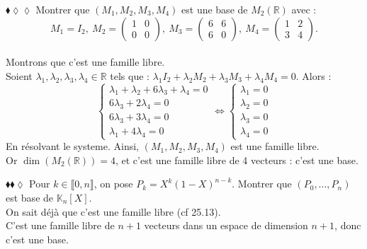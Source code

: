 \documentclass[11pt]{article}
\newcommand*{\R}{\mathbb{R}}
\newcommand*{\K}{\mathbb{K}}
\begin{document}
\begin{exercise}{$\blacklozenge\lozenge\lozenge$}{}
    Montrer que $(M_1, M_2, M_3, M_4)$ est une base de $M_2(\R)$ avec :
    \begin{equation*}
        M_1 = I_2, ~ M_2 = \begin{pmatrix} 1 & 0 \\ 0 & 0 \end{pmatrix}, ~ M_3 = \begin{pmatrix} 6 & 6 \\ 6 & 0 \end{pmatrix}, ~ M_4 = \begin{pmatrix} 1 & 2 \\ 3 & 4 \end{pmatrix}.
    \end{equation*}
    \tcblower\\[0.2cm]
    Montrons que c'est une famille libre.\\
    Soient $\lambda_1, \lambda_2, \lambda_3, \lambda_4 \in \R$ tels que : $\lambda_1I_2 + \lambda_2M_2 + \lambda_3M_3 + \lambda_4M_4 = 0$.
    Alors :
    \begin{equation*}
        \begin{cases}
            \lambda_1 + \lambda_2 + 6\lambda_3 + \lambda_4 = 0\\
            6\lambda_3 + 2\lambda_4 = 0\\
            6\lambda_3 + 3\lambda_4 = 0\\
            \lambda_1 + 4\lambda_4 = 0
        \end{cases}
        \iff
        \begin{cases}
            \lambda_1 = 0\\
            \lambda_2 = 0\\
            \lambda_3 = 0\\
            \lambda_4 = 0
        \end{cases}
    \end{equation*}
    En résolvant le systeme. Ainsi, $(M_1, M_2, M_3, M_4)$ est une famille libre.\\
    Or $\dim(M_2(\R))=4$, et c'est une famille libre de 4 vecteurs : c'est une base.
\end{exercise}

\begin{exercise}{$\blacklozenge\blacklozenge\lozenge$}{}
    Pour $k\in\llbracket0,n\rrbracket$, on pose $P_k = X^k(1-X)^{n-k}$. Montrer que $(P_0, ..., P_n)$ est base de $\K_n[X]$.
    \tcblower\\[0.2cm]
    On sait déjà que c'est une famille libre (cf 25.13).\\
    C'est une famille libre de $n+1$ vecteurs dans un espace de dimension $n+1$, donc c'est une base.
\end{exercise}
\end{document}
